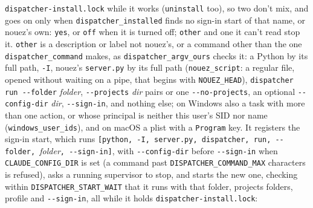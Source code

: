 \documentclass[10pt,a4paper]{article}
\newcommand{\code}[1]{\texttt{#1}}
\begin{document}
\code{dispatcher-install.lock} while it works (\code{uninstall} too), so two don't mix, and goes
on only when \code{dispatcher\_installed} finds no sign-in start of that name, or nouez's own:
\code{yes}, or \code{off} when it is turned off; \code{other} and one it can't read stop it.
\code{other} is a description or label not nouez's, or a command other than the one
\code{dispatcher\_command} makes, as \code{dispatcher\_argv\_ours} checks it: a Python by its full
path, \code{-I}, nouez's \code{server.py} by its full path (\code{nouez\_script}: a regular file, opened
without waiting on a pipe, that begins with \code{NOUEZ\_HEAD}), \code{dispatcher run -{}-folder}
\textit{folder}, \code{-{}-projects} \textit{dir} pairs or one \code{-{}-no-projects}, an optional
\code{-{}-config-dir} \textit{dir}, \code{-{}-sign-in}, and nothing else; on Windows also a task with more than one action, or whose principal is neither this
user's SID nor name (\code{windows\_user\_ids}), and on macOS a plist with a \code{Program}
key. It registers the sign-in start, which runs
\code{[python, -I, server.py, dispatcher, run, -{}-folder, }\textit{folder}\code{, -{}-sign-in]}, with
\code{-{}-config-dir} before \code{-{}-sign-in} when
\code{CLAUDE\_CONFIG\_DIR} is set (a command past \code{DISPATCHER\_COMMAND\_MAX} characters is refused), asks a running
supervisor to stop, and starts the new one, checking within \code{DISPATCHER\_START\_WAIT} that it
runs with that folder, projects folders, profile and \code{-{}-sign-in}, all while it holds
\code{dispatcher-install.lock}:
\end{document}
